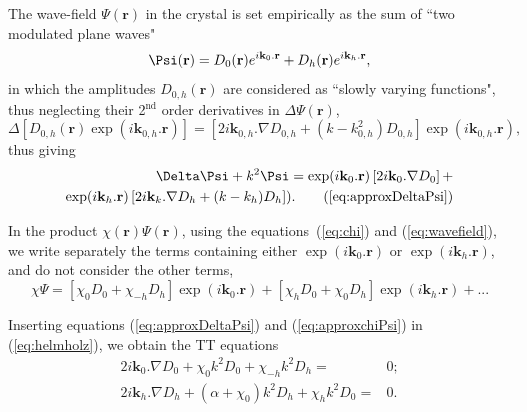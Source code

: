 \documentclass{iucr}
\begin{document}
The wave-field $\Psi(\textbf{r})$ in the crystal is set empirically as the sum of ``two modulated plane waves"
\begin{equation}
\label{eq:wavefield}
    \Psi(\textbf r) = D_0(\textbf r) e^{i \textbf k_0 . \textbf r} + D_h(\textbf r) e^{i \textbf k_h . \textbf r},
\end{equation}
in which the amplitudes $D_{0,h}(\textbf{r})$ are considered as ``slowly varying functions", thus neglecting their 2$^{\text{nd}}$ order derivatives in $\Delta \Psi(\textbf{r})$,
\begin{equation}
\Delta[D_{0,h}(\textbf{r}) \exp(i\textbf{k}_{0,h} . \textbf{r})] =
 [2 i \textbf{k}_{0,h} . \nabla D_{0,h} + (k- k^2_{0,h} ) D_{0,h}] \exp(i\textbf{k}_{0,h} . \textbf{r}), \nonumber
\end{equation}
thus giving
\begin{subequations}\label{eq:approxDeltaPsi}
\begin{align}
    \Delta\Psi + k^2\Psi= 
    \exp(i \textbf{k}_0.\textbf{r})
    \left[ 2 i \textbf{k}_0 . \nabla D_0 \right] + \nonumber \\
    \exp(i \textbf{k}_h.\textbf{r})
    \left[ 2 i \textbf{k}_k . \nabla D_h + (k-k_h) D_h \right]). \tag{\ref{eq:approxDeltaPsi}}
\end{align}
\end{subequations}

In the product $\chi(\textbf{r}) \Psi(\textbf{r})$, using the equations~(\ref{eq:chi}) and (\ref{eq:wavefield}), we write separately the terms containing either $\exp(i \textbf{k}_0 . \textbf{r})$ or $\exp(i \textbf{k}_h . \textbf{r})$, and do not consider the other terms,
\begin{equation}
\label{eq:approxchiPsi}
\chi\Psi =
[\chi_0 D_0 + \chi_{-h} D_h ] \exp(i \textbf{k}_0 . \textbf{r}) +
[\chi_h D_0 + \chi_0 D_h] \exp(i \textbf{k}_h . \textbf{r})+... 
\end{equation}

Inserting equations (\ref{eq:approxDeltaPsi}) and (\ref{eq:approxchiPsi}) in (\ref{eq:helmholz}), we obtain the TT equations 
\begin{subequations}
\label{eq:TTvectorAlpha}
\begin{align}
2 i \textbf{k}_0 . \nabla D_0 + \chi_0 k^2 D_0 + \chi_{-h} k^2 D_h =& 0; \\
2 i \textbf{k}_h . \nabla D_h + (\alpha + \chi_0) k^2 D_h + \chi_{h} k^2 D_0 =& 0.
\end{align}
\end{subequations}
\end{document}
